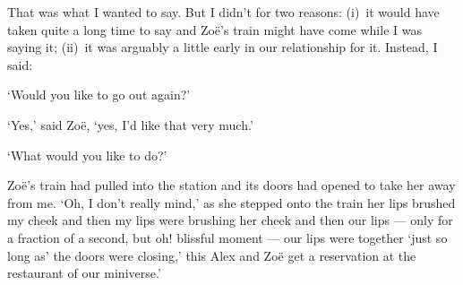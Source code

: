 That was what I wanted to say. But I didn't for two reasons: (i)~it
would have taken quite a long time to say and Zoë's train might
have come while I was saying it; (ii)~it was arguably a {\twelveit
little\/} early in our relationship for it. Instead, I said:

`Would you like to go out again?'

`Yes,' said Zoë, `yes, I'd like that very much.'

`What would you like to do?'

Zoë's train had pulled into the station and its doors had opened
to take her away from me. `Oh, I don't really mind,' as she stepped
onto the train her lips brushed my cheek and then my lips were
brushing her cheek and then our lips --- only for a fraction of a
second, but oh! blissful moment --- our lips were together `just so
long as' the doors were closing,' this Alex and Zoë get a
reservation at the restaurant of our miniverse.'
\vfill\eject
